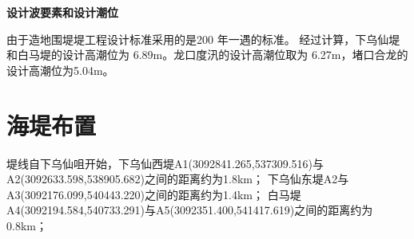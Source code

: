 \documentclass[UTF8, a4paper, 12pt]{ctexart} %
\begin{document}
\begin{table}[h]
    \centering
    \small
    \caption{堤段设计波浪要素表}
    \label{tab:wave_elements}
\end{table}


\par
\textbf{设计波要素和设计潮位}
\par
由于造地围堤堤工程设计标准采用的是200 年一遇的标准。
经过计算，下乌仙堤和白马堤的设计高潮位为 6.89m。龙口度汛的设计高潮位取为
6.27m，堵口合龙的设计高潮位为5.04m。
\section{海堤布置}
堤线自下乌仙咀开始，下乌仙西堤A1(3092841.265,537309.516)与A2(3092633.598,538905.682)之间的距离约为1.8km；
下乌仙东堤A2与A3(3092176.099,540443.220)之间的距离约为1.4km；
白马堤A4(3092194.584,540733.291)与A5(3092351.400,541417.619)之间的距离约为0.8km；
\end{document}
